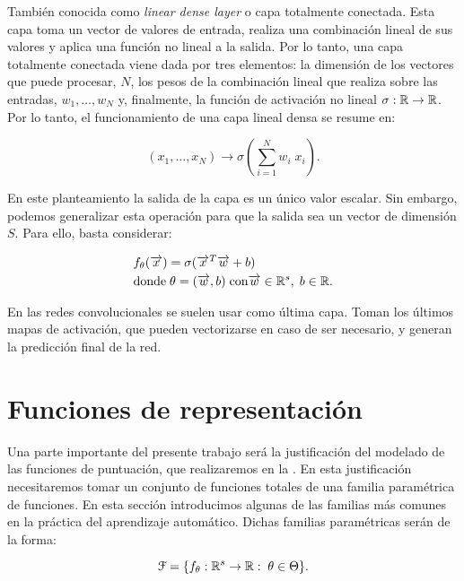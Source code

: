 También conocida como \textit{linear dense layer} o capa totalmente conectada. Esta capa toma un vector de valores de entrada, realiza una combinación lineal de sus valores y aplica una función no lineal a la salida. Por lo tanto, una capa totalmente conectada viene dada por tres elementos: la dimensión de los vectores que puede procesar, $N$, los pesos de la combinación lineal que realiza sobre las entradas, $w_1, \ldots, w_N$ y, finalmente, la función de activación no lineal $\sigma: \mathbb{R} \to \mathbb{R}$. Por lo tanto, el funcionamiento de una capa lineal densa se resume en:

\begin{equation}
    (x_1, \ldots, x_N) \to \sigma(\sum_{i = 1}^{N} w_i \; x_i).
\end{equation}

En este planteamiento la salida de la capa es un único valor escalar. Sin embargo, podemos generalizar esta operación para que la salida sea un vector de dimensión $S$. Para ello, basta considerar:

\begin{equation}
\begin{split}
    & f_\theta(\overrightarrow{x}) = \sigma(\overrightarrow{x}^T \overrightarrow{w} + b) \\
    & \text{donde} \; \theta = (\overrightarrow{w}, b) \; \text{con} \overrightarrow{w} \in \mathbb{R}^s, \; b \in \mathbb{R}.
\end{split}
\end{equation}

En las redes convolucionales se suelen usar como última capa. Toman los últimos mapas de activación, que pueden vectorizarse en caso de ser necesario, y generan la predicción final de la red.

\section{Funciones de representación} \label{sec:funciones_representacion}

Una parte importante del presente trabajo será la justificación del modelado de las funciones de puntuación, que realizaremos en la . En esta justificación necesitaremos tomar un conjunto de funciones totales de una familia paramétrica de funciones. En esta sección introducimos algunas de las familias más comunes en la práctica del aprendizaje automático. Dichas familias paramétricas serán de la forma:

\begin{equation}
	\mathcal{F} = \{  f_{\theta}: \mathbb{R}^s \to \mathbb{R}: \; \theta \in \Theta \}.
\end{equation}

